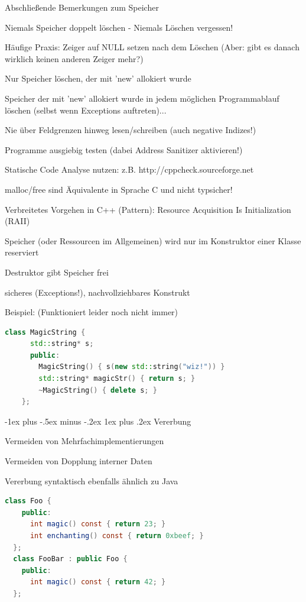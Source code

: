 \documentclass[10pt]{article}
\makeatletter
\renewcommand{\subsubsection}{\@startsection{subsubsection}{3}{0mm}%
                                {-1ex plus -.5ex minus -.2ex}%
                                {1ex plus .2ex}%
                                {\normalfont\small\bfseries}}
\makeatother
\begin{document}
\begin{itemize*}
  \item Abschließende Bemerkungen zum Speicher
  \begin{itemize*}
    \item Niemals Speicher doppelt löschen - Niemals Löschen vergessen!
    \item Häufige Praxis: Zeiger auf NULL setzen nach dem Löschen (Aber: gibt es danach wirklich keinen anderen Zeiger mehr?)
    \item Nur Speicher löschen, der mit 'new' allokiert wurde
    \item Speicher der mit 'new' allokiert wurde in jedem möglichen Programmablauf löschen (selbst wenn Exceptions auftreten)...
    \item Nie über Feldgrenzen hinweg lesen/schreiben (auch negative Indizes!)
    \item Programme ausgiebig testen (dabei Address Sanitizer aktivieren!)
    \item Statische Code Analyse nutzen: z.B. http://cppcheck.sourceforge.net
    \item malloc/free sind Äquivalente in Sprache C und nicht typsicher!
  \end{itemize*}
  \item Verbreitetes Vorgehen in C++ (Pattern): Resource Acquisition Is Initialization (RAII)
  \begin{itemize*}
    \item Speicher (oder Ressourcen im Allgemeinen) wird nur im Konstruktor einer Klasse reserviert
    \item Destruktor gibt Speicher frei
    \item sicheres (Exceptions!), nachvollziehbares Konstrukt
    \item Beispiel: (Funktioniert leider noch nicht immer)
    \begin{lstlisting}[language=C++]
    class MagicString {
      std::string* s;
      public:
        MagicString() { s(new std::string("wiz!")) }
        std::string* magicStr() { return s; }
        ~MagicString() { delete s; }
    };
    \end{lstlisting}
  \end{itemize*}
\end{itemize*}

\subsubsection{Vererbung}
\begin{itemize*}
  \item Vermeiden von Mehrfachimplementierungen
  \item Vermeiden von Dopplung interner Daten
  \item Vererbung syntaktisch ebenfalls ähnlich zu Java
  \begin{lstlisting}[language=java]
  class Foo {
    public:
      int magic() const { return 23; }
      int enchanting() const { return 0xbeef; }
  };
  class FooBar : public Foo {
    public:
      int magic() const { return 42; }
  };
  \end{lstlisting}
\end{itemize*}
\end{document}
